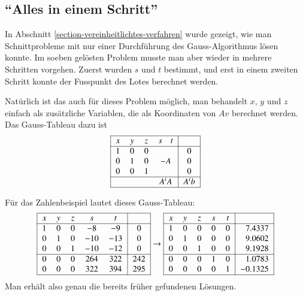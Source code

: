 %
%
\subsection{``Alles in einem Schritt''}
In Abschnitt \ref{section-vereinheitlichtes-verfahren} wurde gezeigt,
wie man Schnittprobleme mit nur einer Durchführung des Gauss-Algorithmus
lösen konnte.
Im soeben gelösten Problem musste man aber wieder
in mehrere Schritten vorgehen.
Zuerst wurden $s$ und $t$ bestimmt,
und erst in einem zweiten Schritt konnte der Fusspunkt des Lotes
berechnet werden.

Natürlich ist das auch für dieses Problem möglich, man behandelt
$x$, $y$ und $z$ einfach als zusätzliche Variablen, die als Koordinaten
von $Av$ berechnet werden.
Das Gauss-Tableau dazu ist
\[
\begin{tabular}{|>{$}c<{$}>{$}c<{$}>{$}c<{$}>{$}c<{$}|>{$}c<{$}|}
\hline
x&y&z&s\quad t&\\
\hline
1&0&0&        &0\\
0&1&0&-A   &0\\
0&0&1&        &0\\
\hline
 & & &A^tA    &A^tb\\
\hline
\end{tabular}
\]
\begin{beispiel}
Für das Zahlenbeispiel lautet dieses Gauss-Tableau:
\[
\begin{tabular}{|>{$}c<{$}>{$}c<{$}>{$}c<{$}>{$}c<{$}>{$}c<{$}|>{$}c<{$}|}
\hline
x&y&z&s  &  t&\\
\hline
1&0&0& -8& -9&0\\
0&1&0&-10&-13&0\\
0&0&1&-10&-12&0\\
\hline
0&0&0&264&322&242\\
0&0&0&322&394&295\\
\hline
\end{tabular}
\rightarrow
\begin{tabular}{|>{$}c<{$}>{$}c<{$}>{$}c<{$}>{$}c<{$}>{$}c<{$}|>{$}r<{$}|}
\hline
x&y&z&s  &  t&\\
\hline
1&0&0&0&0&7.4337\\
0&1&0&0&0&9.0602\\
0&0&1&0&0&9.1928\\
\hline
0&0&0&1&0&1.0783\\
0&0&0&0&1&-0.1325\\
\hline
\end{tabular}
\]
Man erhält also genau die bereits früher gefundenen Lösungen.
\end{beispiel}

